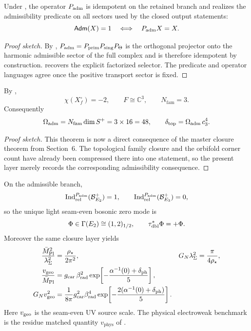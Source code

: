 \begin{theorem}
Under , the
operator $P_{\mathrm{adm}}$ is idempotent on the retained branch and realizes the admissibility predicate
on all sectors used by the closed output statements:
\[
\mathsf{Adm}(X)=1
\quad\Longleftrightarrow\quad
P_{\mathrm{adm}} X = X.
\]
\end{theorem}

\begin{proof}[Proof sketch]
By , $P_{\mathrm{adm}}=P_{\mathrm{prim}} P_{\mathrm{sing}}P_\Theta$ is the orthogonal projector
onto the harmonic admissible sector of the full complex and is therefore idempotent by
construction.  recovers the explicit factorized
selector. The predicate and operator languages agree once the positive transport sector is fixed.
\end{proof}

\begin{theorem}
By ,
\[
\chi(X_f^\circ)=-2,
\qquad
F\cong\mathbb C^3,
\qquad
N_{\mathrm{fam}}=3.
\]
Consequently
\[
\Omega_{\mathrm{adm}}=N_{\mathrm{fam}}\dim S^+=3\times 16=48,
\qquad
\delta_{\mathrm{top}}=\Omega_{\mathrm{adm}}\,c_3^4.
\]
\end{theorem}

\begin{proof}[Proof sketch]
This theorem is now a direct consequence of the master closure theorem from Section~6. The
topological family closure and the orbifold corner count have already been compressed there
into one statement, so the present layer merely records the corresponding admissibility
consequence.
\end{proof}

\begin{theorem}
On the admissible branch,
\[
\operatorname{Ind}_{\mathrm{rel}}^{P_{\mathrm{adm}}}(\mathcal B_{E_2}^+)=1,
\qquad
\operatorname{Ind}_{\mathrm{rel}}^{P_{\mathrm{adm}}}(\mathcal B_{E_3}^+)=0,
\]
so the unique light seam-even bosonic zero mode is
\[
\Phi\in\Gamma(E_2)\cong(1,2)_{1/2},
\qquad
\tau_{\mathrm{dbl}}^{\ast}\Phi=+\Phi.
\]
Moreover the same closure layer yields
\[
\begin{aligned}
\frac{\bar M_{\mathrm{Pl}}^2}{\lambda_\Sigma^2}&=\frac{\rho_\star}{2\pi^2},
&
G_N\lambda_\Sigma^2&=\frac{\pi}{4\rho_\star},
\\
\frac{v_{\mathrm{geo}}}{\bar M_{\mathrm{Pl}}}&=g_{\mathrm{car}}\,\beta_{\mathrm{rad}}^2
\exp\!\left[-\frac{\alpha^{-1}(0)+\delta_{\mathrm{ph}}}{5}\right],
\\
G_Nv_{\mathrm{geo}}^2&=\frac{1}{8\pi}g_{\mathrm{car}}^2\beta_{\mathrm{rad}}^4
\exp\!\left[-\frac{2(\alpha^{-1}(0)+\delta_{\mathrm{ph}})}{5}\right].
\end{aligned}
\]
Here $v_{\mathrm{geo}}$ is the seam-even UV source scale. The physical electroweak benchmark is the residue
matched quantity $v_{\mathrm{phys}}$ of .
\end{theorem}

